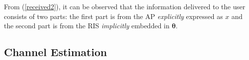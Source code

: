 \documentclass[draftclsnofoot,onecolumn,12pt]{IEEEtran}
\newtheorem{remark}{Remark}
\begin{document}
From (\ref{received2}), it can be observed that the information delivered to the user consists of two parts:
the first part is from the AP {\it explicitly} expressed as ${ x}$ and the second part is from the RIS  {\it implicitly} embedded in ${\bm \theta}$.

\subsection{Channel Estimation}\label{ce}
	
\end{document}
